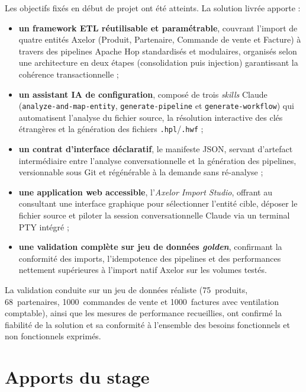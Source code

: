 Les objectifs fixés en début de projet ont été atteints. La solution livrée apporte :

\begin{itemize}
  \item \textbf{un framework ETL réutilisable et paramétrable}, couvrant l'import de quatre entités Axelor (Produit, Partenaire, Commande de vente et Facture) à travers des pipelines Apache Hop standardisés et modulaires, organisés selon une architecture en deux étapes (consolidation puis injection) garantissant la cohérence transactionnelle ;
  \item \textbf{un assistant IA de configuration}, composé de trois \textit{skills} Claude (\texttt{analyze-and-map-entity}, \texttt{generate-pipeline} et \texttt{generate-workflow}) qui automatisent l'analyse du fichier source, la résolution interactive des clés étrangères et la génération des fichiers \texttt{.hpl}/\texttt{.hwf} ;
  \item \textbf{un contrat d'interface déclaratif}, le manifeste JSON, servant d'artefact intermédiaire entre l'analyse conversationnelle et la génération des pipelines, versionnable sous Git et régénérable à la demande sans ré-analyse ;
  \item \textbf{une application web accessible}, l'\textit{Axelor Import Studio}, offrant au consultant une interface graphique pour sélectionner l'entité cible, déposer le fichier source et piloter la session conversationnelle Claude via un terminal PTY intégré ;
  \item \textbf{une validation complète sur jeu de données \textit{golden}}, confirmant la conformité des imports, l'idempotence des pipelines et des performances nettement supérieures à l'import natif Axelor sur les volumes testés.
\end{itemize}

La validation conduite sur un jeu de données réaliste (75~produits, 68~partenaires, 1000~commandes de vente et 1000~factures avec ventilation comptable), ainsi que les mesures de performance recueillies, ont confirmé la fiabilité de la solution et sa conformité à l'ensemble des besoins fonctionnels et non fonctionnels exprimés.

\section*{Apports du stage}

